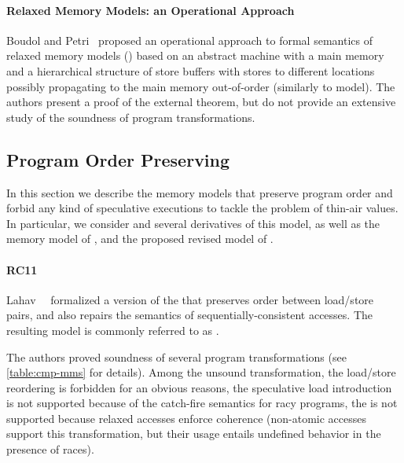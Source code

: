 \paragraph{Relaxed Memory Models: an Operational Approach}

Boudol and Petri~\cite{Boudol-Petri:POPL09} proposed 
an operational approach to 
formal semantics of relaxed memory models (\RMMOA)
based on an abstract machine with a main memory 
and a hierarchical structure of store buffers 
with stores to different locations possibly 
propagating to the main memory out-of-order
(similarly to \PSO model).
The authors present a proof of the external \DRF theorem,
but do not provide an extensive study 
of the soundness of program transformations.

\subsection{Program Order Preserving}
\label{sec:catalog:porf}

In this section we describe the memory models 
that preserve program order and forbid any 
kind of speculative executions to tackle 
the problem of thin-air values. 
In particular, we consider \RCMM and 
several derivatives of this model, 
as well as the memory model of \OCaml, 
and the proposed revised model of \Java.  

\paragraph{RC11}

Lahav~\etal~\cite{Lahav-al:PLDI17} formalized 
a version of the \CMM that preserves order between load/store pairs, 
and also repairs the semantics of sequentially-consistent accesses.
The resulting model is commonly referred to as \RCMM. 

The authors proved soundness of several program transformations 
(see \cref{table:cmp-mms} for details). 
Among the unsound transformation, 
the load/store reordering is forbidden for an obvious reasons, 
the speculative load introduction is not supported 
because of the catch-fire semantics for racy programs, 
the \CSE is not supported because relaxed accesses 
enforce coherence (non-atomic accesses 
support this transformation, but their usage entails 
undefined behavior in the presence of races).


